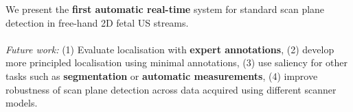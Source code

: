 \documentclass[a0paper,portrait]{baposter}
\begin{document}
\begin{poster}
{\begin{multicols}{2}
We present the {\bf first automatic real-time} system for standard scan plane detection in free-hand 2D fetal US streams.\\\vspace{-10pt}\\
\emph{Future work:} (1) Evaluate localisation with {\bf expert annotations}, (2) develop more principled localisation using minimal annotations, (3) use saliency for other tasks such as {\bf segmentation} or {\bf automatic measurements}, (4) improve robustness of scan plane detection across data acquired using different scanner models. 
\end{multicols} 

}


\end{poster}
\end{document}
